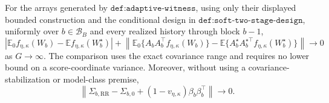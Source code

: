 For the arrays generated by \(\texttt{def:adaptive-witness}\), using only their displayed bounded construction and the conditional design in \(\texttt{def:soft-two-stage-design}\), uniformly over \(b\in\mathcal B_B\) and every realized history through block \(b-1\),
\[
 \left|\mathbb E_0f_{\eta,\kappa}(W_b)-\mathbb Ef_{\eta,\kappa}(W_b^\star)\right|
 +\left\|\mathbb E_0\{A_bA_b^\top f_{\eta,\kappa}(W_b)\}
 -\mathbb E\{A_b^\star A_b^{\star\top}f_{\eta,\kappa}(W_b^\star)\}\right\|
 \longrightarrow0
\]
as \(G\to\infty\).  The comparison uses the exact covariance range and requires no lower bound on a score-coordinate variance.  Moreover, without using a covariance-stabilization or model-class premise,
\[
 \left\|\Sigma_{b,\mathrm{RR}}-\Sigma_{b,0}
 +(1-v_{\eta,\kappa})\beta_b\beta_b^\top\right\|\longrightarrow0.
\]